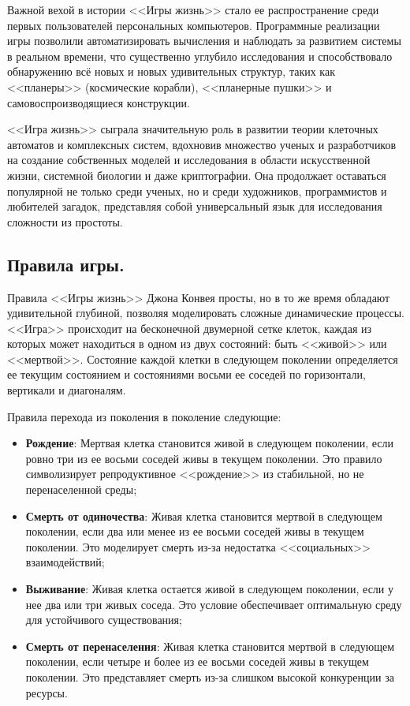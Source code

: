 Важной вехой в истории <<Игры жизнь>> стало ее распространение среди первых пользователей персональных компьютеров. Программные реализации игры позволили автоматизировать вычисления и наблюдать за развитием системы в реальном времени, что существенно углубило исследования и способствовало обнаружению всё новых и новых удивительных структур, таких как <<планеры>> (космические корабли), <<планерные пушки>> и самовоспроизводящиеся конструкции.

<<Игра жизнь>> сыграла значительную роль в развитии теории клеточных автоматов и комплексных систем, вдохновив множество ученых и разработчиков на создание собственных моделей и исследования в области искусственной жизни, системной биологии и даже криптографии. Она продолжает оставаться популярной не только среди ученых, но и среди художников, программистов и любителей загадок, представляя собой универсальный язык для исследования сложности из простоты.

\subsection{\label{subsec:ch01/sec04/subsec02}Правила игры.}
Правила <<Игры жизнь>> Джона Конвея просты, но в то же время обладают удивительной глубиной, позволяя моделировать сложные динамические процессы. <<Игра>> происходит на бесконечной двумерной сетке клеток, каждая из которых может находиться в одном из двух состояний: быть <<живой>> или <<мертвой>>. Состояние каждой клетки в следующем поколении определяется ее текущим состоянием и состояниями восьми ее соседей по горизонтали, вертикали и диагоналям.

Правила перехода из поколения в поколение следующие:
	\begin{itemize}
		\item \textbf{Рождение}: Мертвая клетка становится живой в следующем поколении, если ровно три из ее восьми соседей живы в текущем поколении. Это правило символизирует репродуктивное <<рождение>> из стабильной, но не перенаселенной среды;
		\item \textbf{Смерть от одиночества}: Живая клетка становится мертвой в следующем поколении, если два или менее из ее восьми соседей живы в текущем поколении. Это моделирует смерть из-за недостатка <<социальных>> взаимодействий;
		\item \textbf{Выживание}: Живая клетка остается живой в следующем поколении, если у нее два или три живых соседа. Это условие обеспечивает оптимальную среду для устойчивого существования;
		\item \textbf{Смерть от перенаселения}: Живая клетка становится мертвой в следующем поколении, если четыре и более из ее восьми соседей живы в текущем поколении. Это представляет смерть из-за слишком высокой конкуренции за ресурсы.
	\end{itemize}

